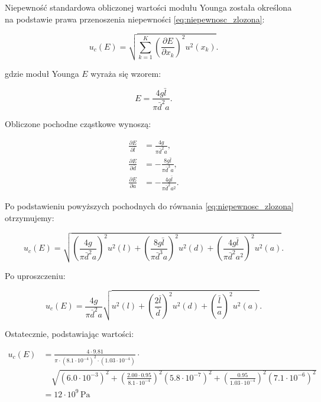 \documentclass[a4paper,12pt]{article}
\begin{document}
Niepewność standardowa obliczonej wartości modułu Younga została określona na podstawie prawa przenoszenia niepewności \eqref{eq:niepewnosc_zlozona}:

\begin{equation}
\label{eq:niepewnosc_zlozona}
    u_c(E) = \sqrt{\sum_{k=1}^{K} \left( \frac{\partial E}{\partial x_k} \right)^2 u^2(x_k)}.
\end{equation}

gdzie moduł Younga \( E \) wyraża się wzorem:

\begin{equation*}
E = \frac{4g\bar{l}}{\pi\bar{d}^2 a}.
\end{equation*}

Obliczone pochodne cząstkowe wynoszą:

\begin{align*}
    \frac{\partial E}{\partial \bar{l}} &= \frac{4g}{\pi \bar{d}^2 a}, \\
    \frac{\partial E}{\partial \bar{d}} &= -\frac{8g\bar{l}}{\pi \bar{d}^3 a}, \\
    \frac{\partial E}{\partial a} &= -\frac{4g\bar{l}}{\pi \bar{d}^2 a^2}.
\end{align*}

Po podstawieniu powyższych pochodnych do równania \eqref{eq:niepewnosc_zlozona} otrzymujemy:

\begin{equation*}
u_c(E) = \sqrt{\left( \frac{4g}{\pi \bar{d}^2 a} \right)^2 u^2(l) 
+ \left( \frac{8g\bar{l}}{\pi \bar{d}^3 a} \right)^2 u^2(d) 
+ \left( \frac{4g\bar{l}}{\pi \bar{d}^2 a^2} \right)^2 u^2(a)}.
\end{equation*}

Po uproszczeniu:

\begin{equation*}
u_c(E) = \frac{4g}{\pi \bar{d}^2 a} 
\sqrt{ u^2(l) + \left( \frac{2\bar{l}}{\bar{d}} \right)^2 u^2(d) + \left( \frac{\bar{l}}{a} \right)^2 u^2(a) }.
\end{equation*}

Ostatecznie, podstawiając wartości: 

\begin{align*}
u_c(E) &= \frac{4 \cdot 9.81}{\pi \cdot (8.1 \cdot 10^{-4})^2 \cdot (1.03 \cdot 10^{-4})} \cdot 
\\
&\quad \sqrt{ (6.0 \cdot 10^{-3})^2 + \left( \frac{2.00 \cdot 0.95}{8.1 \cdot 10^{-4}} \right)^2 (5.8 \cdot 10^{-7})^2 + \left( \frac{0.95}{1.03 \cdot 10^{-4}} \right)^2 (7.1 \cdot 10^{-6})^2 } 
\\
&= 12 \cdot 10^9\,\text{Pa}
\end{align*}
\end{document}
